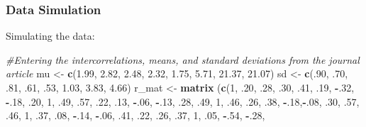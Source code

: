 \documentclass[
  11pt,
]{book}
\newenvironment{Shaded}{\begin{snugshade}}{\end{snugshade}}
\newcommand{\CommentTok}[1]{\textcolor[rgb]{0.37,0.37,0.37}{\textit{#1}}}
\newcommand{\DecValTok}[1]{\textcolor[rgb]{0.06,0.06,0.06}{#1}}
\newcommand{\FloatTok}[1]{\textcolor[rgb]{0.06,0.06,0.06}{#1}}
\newcommand{\FunctionTok}[1]{\textcolor[rgb]{0.27,0.27,0.27}{\textbf{#1}}}
\newcommand{\NormalTok}[1]{#1}
\newcommand{\OtherTok}[1]{\textcolor[rgb]{0.37,0.37,0.37}{#1}}
\newcommand{\SpecialCharTok}[1]{\textcolor[rgb]{0.43,0.43,0.43}{\textbf{#1}}}
\begin{document}
\hypertarget{data-simulation-1}{%
\subsubsection{Data Simulation}\label{data-simulation-1}}

Simulating the data:

\begin{Shaded}
\begin{Highlighting}[]
\CommentTok{\#Entering the intercorrelations, means, and standard deviations from the journal article}
\NormalTok{mu }\OtherTok{\textless{}{-}} \FunctionTok{c}\NormalTok{(}\FloatTok{1.99}\NormalTok{, }\FloatTok{2.82}\NormalTok{, }\FloatTok{2.48}\NormalTok{, }\FloatTok{2.32}\NormalTok{, }\FloatTok{1.75}\NormalTok{, }\FloatTok{5.71}\NormalTok{, }\FloatTok{21.37}\NormalTok{, }\FloatTok{21.07}\NormalTok{)}
\NormalTok{sd }\OtherTok{\textless{}{-}} \FunctionTok{c}\NormalTok{(.}\DecValTok{90}\NormalTok{, .}\DecValTok{70}\NormalTok{, .}\DecValTok{81}\NormalTok{, .}\DecValTok{61}\NormalTok{, .}\DecValTok{53}\NormalTok{, }\FloatTok{1.03}\NormalTok{, }\FloatTok{3.83}\NormalTok{, }\FloatTok{4.66}\NormalTok{)}
\NormalTok{r\_mat }\OtherTok{\textless{}{-}} \FunctionTok{matrix}\NormalTok{ (}\FunctionTok{c}\NormalTok{(}\DecValTok{1}\NormalTok{, .}\DecValTok{20}\NormalTok{, .}\DecValTok{28}\NormalTok{, .}\DecValTok{30}\NormalTok{, .}\DecValTok{41}\NormalTok{, .}\DecValTok{19}\NormalTok{, }\SpecialCharTok{{-}}\NormalTok{.}\DecValTok{32}\NormalTok{, }\SpecialCharTok{{-}}\NormalTok{.}\DecValTok{18}\NormalTok{,}
\NormalTok{        .}\DecValTok{20}\NormalTok{, }\DecValTok{1}\NormalTok{, .}\DecValTok{49}\NormalTok{, .}\DecValTok{57}\NormalTok{, .}\DecValTok{22}\NormalTok{, .}\DecValTok{13}\NormalTok{, }\SpecialCharTok{{-}}\NormalTok{.}\DecValTok{06}\NormalTok{, }\SpecialCharTok{{-}}\NormalTok{.}\DecValTok{13}\NormalTok{,}
\NormalTok{        .}\DecValTok{28}\NormalTok{, .}\DecValTok{49}\NormalTok{, }\DecValTok{1}\NormalTok{, .}\DecValTok{46}\NormalTok{, .}\DecValTok{26}\NormalTok{, .}\DecValTok{38}\NormalTok{, }\SpecialCharTok{{-}}\NormalTok{.}\DecValTok{18}\NormalTok{,}\SpecialCharTok{{-}}\NormalTok{.}\DecValTok{08}\NormalTok{, }
\NormalTok{        .}\DecValTok{30}\NormalTok{, .}\DecValTok{57}\NormalTok{, .}\DecValTok{46}\NormalTok{,  }\DecValTok{1}\NormalTok{, .}\DecValTok{37}\NormalTok{, .}\DecValTok{08}\NormalTok{, }\SpecialCharTok{{-}}\NormalTok{.}\DecValTok{14}\NormalTok{, }\SpecialCharTok{{-}}\NormalTok{.}\DecValTok{06}\NormalTok{,}
\NormalTok{        .}\DecValTok{41}\NormalTok{, .}\DecValTok{22}\NormalTok{, .}\DecValTok{26}\NormalTok{, .}\DecValTok{37}\NormalTok{, }\DecValTok{1}\NormalTok{, .}\DecValTok{05}\NormalTok{, }\SpecialCharTok{{-}}\NormalTok{.}\DecValTok{54}\NormalTok{, }\SpecialCharTok{{-}}\NormalTok{.}\DecValTok{28}\NormalTok{, }

\end{Highlighting}
\end{Shaded}
\end{document}
